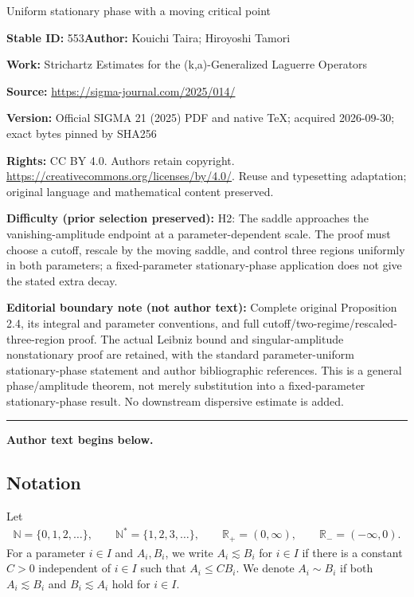 \documentclass[11pt]{article}
\numberwithin{equation}{section}
\def\R{\mathbb{R}}%
\begin{document}
\begin{center}\Large Uniform stationary phase with a moving critical point\end{center}
\noindent\textbf{Stable ID:} 553\quad\textbf{Author:} Kouichi Taira; Hiroyoshi Tamori\par
\noindent\textbf{Work:} Strichartz Estimates for the (k,a)-Generalized Laguerre Operators\par
\noindent\textbf{Source:} \url{https://sigma-journal.com/2025/014/}\par
\noindent\textbf{Version:} Official SIGMA 21 (2025) PDF and native TeX; acquired 2026-09-30; exact bytes pinned by SHA256\par
\noindent\textbf{Rights:} CC BY 4.0. Authors retain copyright. \url{https://creativecommons.org/licenses/by/4.0/}. Reuse and typesetting adaptation; original language and mathematical content preserved.\par
\noindent\textbf{Difficulty (prior selection preserved):} {\CJKfont H2: The saddle approaches the vanishing-amplitude endpoint at a parameter-dependent scale. The proof must choose a cutoff, rescale by the moving saddle, and control three regions uniformly in both parameters; a fixed-parameter stationary-phase application does not give the stated extra decay.}\par
\medskip\noindent\textbf{Editorial boundary note (not author text):} Complete original Proposition 2.4, its integral and parameter conventions, and full cutoff/two-regime/rescaled-three-region proof. The actual Leibniz bound and singular-amplitude nonstationary proof are retained, with the standard parameter-uniform stationary-phase statement and author bibliographic references. This is a general phase/amplitude theorem, not merely substitution into a fixed-parameter stationary-phase result. No downstream dispersive estimate is added.\par
\medskip\hrule\medskip\noindent\textbf{Author text begins below.}\par
\setcounter{section}{1}\setcounter{subsection}{4}
\subsection{Notation}
Let
\begin{align*}
\mathbb{N}=\{0,1,2,\hdots\},\qquad \mathbb{N}^*=\{1,2,3,\hdots\}, \qquad \R_{+}=(0,\infty),\qquad \R_-=(-\infty,0).
\end{align*}
For a parameter $i\in I$ and $A_i,B_i$, we write $A_i\lesssim B_i$ for $i\in I$ if there is a constant $C>0$ independent of $i\in I$ such that $A_i\leq CB_i$. We denote $A_i\sim B_i$ if both $A_i\lesssim B_i$ and $B_i\lesssim A_i$ hold for $i\in I$.
\end{document}
